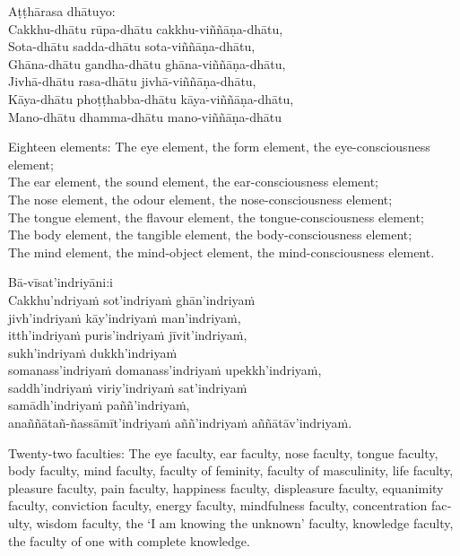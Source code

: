 \suttaRef{[MN 148]}

Aṭṭhārasa dhātuyo:\\
Cakkhu-dhātu rūpa-dhātu cakkhu-viññāṇa-dhātu,\\
Sota-dhātu sadda-dhātu sota-viññāṇa-dhātu,\\
Ghāna-dhātu gandha-dhātu ghāna-viññāṇa-dhātu,\\
Jivhā-dhātu rasa-dhātu jivhā-viññāṇa-dhātu,\\
Kāya-dhātu phoṭṭhabba-dhātu kāya-viññāṇa-dhātu,\\
Mano-dhātu dhamma-dhātu mano-viññāṇa-dhātu

\begin{english}
  Eighteen elements: The eye element, the form element, the eye-consciousness\\
  element;\\
  The ear element, the sound element, the ear-consciousness element;\\
  The nose element, the odour element, the nose-consciousness element;\\
  The tongue element, the flavour element, the tongue-consciousness element;\\
  The body element, the tangible element, the body-consciousness element;\\
  The mind element, the mind-object element, the mind-consciousness element.
\end{english}

\suttaRef{[MN 115]}

Bā-vīsat’indriyāni:i\\
Cakkhu’ndriyaṁ sot’indriyaṁ ghān’indriyaṁ\\
jivh’indriyaṁ kāy’indriyaṁ man’indriyaṁ,\\
itth’indriyaṁ puris’indriyaṁ jīvit’indriyaṁ,\\
sukh’indriyaṁ dukkh’indriyaṁ\\
somanass’indriyaṁ domanass’indriyaṁ upekkh’indriyaṁ,\\
saddh’indriyaṁ viriy’indriyaṁ sat’indriyaṁ\\
samādh’indriyaṁ paññ’indriyaṁ,\\
anaññātañ-ñassāmīt’indriyaṁ aññ’indriyaṁ aññātāv’indriyaṁ.

\begin{english}
  Twenty-two faculties: The eye faculty, ear faculty, nose faculty, tongue faculty, body faculty, mind faculty, faculty of feminity, faculty of masculinity, life faculty, pleasure faculty, pain faculty, happiness faculty, displeasure faculty, equanimity faculty, conviction faculty, energy faculty, mindfulness faculty, concentration faculty, wisdom faculty, the ‘I am knowing the unknown’ faculty, knowledge faculty, the faculty of one with complete knowledge.
\end{english}


